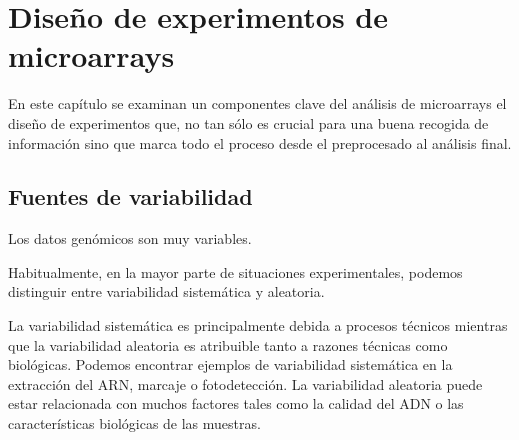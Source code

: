 \chapter{Dise\~no de experimentos de microarrays}

En este cap\'itulo se examinan un componentes clave del an\'alisis de microarrays el dise\~no de experimentos que, no tan s\'olo es
crucial para una buena recogida de informaci\'on sino que marca todo el proceso desde el preprocesado al an\'alisis final.

\section{Fuentes de variabilidad}

Los datos gen\'omicos son muy variables.



\vspace{-0.5cm}
\begin{figure}[!h]
\label{c04variabilitySources}
\end{figure}


Habitualmente, en la mayor parte de situaciones experimentales, podemos
distinguir entre variabilidad sistem\'atica y aleatoria.

La variabilidad sistem\'atica es principalmente debida a procesos t\'ecnicos
mientras que la variabilidad aleatoria es atribuible tanto a razones t\'ecnicas
como biol\'ogicas. Podemos encontrar ejemplos de variabilidad sistem\'atica en la
extracci\'on del ARN, marcaje o fotodetecci\'on. La variabilidad aleatoria puede
estar relacionada con muchos factores tales como la calidad del ADN o las
caracter\'isticas biol\'ogicas de las muestras.

